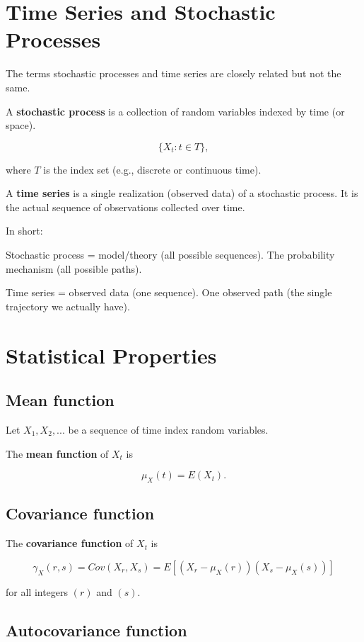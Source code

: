 \documentclass[
  11pt,
  a4paper,
]{report}
\begin{document}
\section{Time Series and Stochastic
Processes}\label{time-series-and-stochastic-processes}

The terms stochastic processes and time series are closely related but
not the same.

A \textbf{stochastic process} is a collection of random variables
indexed by time (or space).

\[\{X_t : t \in T\},\]

where \(T\) is the index set (e.g., discrete or continuous time).

A \textbf{time series} is a single realization (observed data) of a
stochastic process. It is the actual sequence of observations collected
over time.

In short:

Stochastic process = model/theory (all possible sequences). The
probability mechanism (all possible paths).

Time series = observed data (one sequence). One observed path (the
single trajectory we actually have).

\section{Statistical Properties}\label{statistical-properties}

\subsection{Mean function}\label{mean-function}

Let \({X_1, X_2, ...}\) be a sequence of time index random variables.

The \textbf{mean function} of \({X_t}\) is

\[\mu_X(t)=E(X_t).\]

\subsection{Covariance function}\label{covariance-function}

The \textbf{covariance function} of \({X_t}\) is

\[\gamma_X(r, s)=Cov(X_r, X_s)=E[(X_r-\mu_X(r))(X_s-\mu_X(s))]\]

for all integers \((r)\) and \((s)\).

\subsection{Autocovariance function}\label{autocovariance-function}
\end{document}
